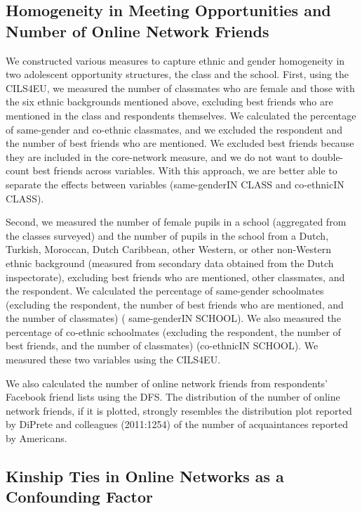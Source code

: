 \documentclass[letterpaper]{article} %
\begin{document}
\subsection{Homogeneity in Meeting 	Opportunities and Number of Online Network Friends}

We constructed various measures to capture ethnic and gender homogeneity in two adolescent opportunity structures, the class and the school. First, using the CILS4EU, we measured the number of classmates who are female and those with the six ethnic backgrounds mentioned above, excluding best friends who are mentioned in the class and respondents themselves. We calculated the percentage of same-gender and co-ethnic classmates, and we excluded the respondent and the number of best friends who are mentioned. We excluded best friends because they are included in the core-network measure,
and we do not want to double-count best friends across variables. With this approach, we are better able to separate the effects between variables (same-genderIN CLASS and co-ethnicIN CLASS).
		
Second, we measured the number of female pupils in a school (aggregated from the classes surveyed) and the number of pupils in the school from a Dutch, Turkish, Moroccan, Dutch Caribbean, other Western, or other non-Western ethnic background (measured from secondary data obtained from the Dutch inspectorate), excluding best friends who are mentioned, other classmates,
and the respondent. We calculated the percentage
of same-gender schoolmates (excluding the respondent, the number of best friends who are mentioned, and the number of classmates) ( same-genderIN SCHOOL). We also measured the percentage of co-ethnic schoolmates (excluding the respondent, the number of best friends, and the number of classmates) (co-ethnicIN SCHOOL). We measured these two variables using the CILS4EU.

We also calculated the number of online network friends from respondents’ Facebook friend lists using the DFS. The distribution of the number of online network friends, if it is plotted, strongly resembles the distribution plot reported by DiPrete and colleagues (2011:1254) of the number of acquaintances reported by Americans.

\subsection{Kinship Ties in Online Networks as a Confounding Factor}
\end{document}

